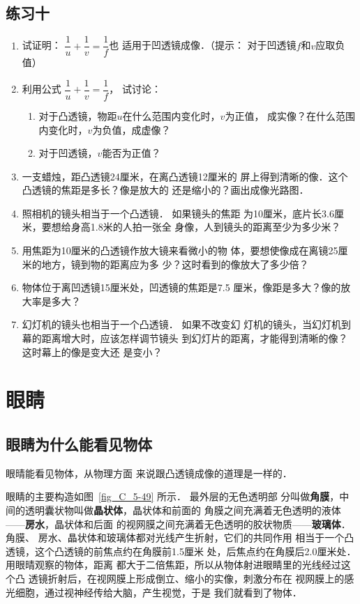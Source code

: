 \subsection*{练习十}

\begin{enumerate}
    \item 试证明：
$\dfrac{1}{u}+\dfrac{1}{v}=\dfrac{1}{f}$也
适用于凹透镜成像．（提示：
对于凹透镜$f$和$v$应取负值）
\item  利用公式
$\dfrac{1}{u}+\dfrac{1}{v}=\dfrac{1}{f}$，
试讨论：
\begin{enumerate}
    \item 对于凸透镜，物距$u$在什么范围内变化时，$v$为正值，
    成实像？在什么范围内变化时，$v$为负值，成虚像？
    \item 对于凹透镜，$v$能否为正值？
\end{enumerate}
\item 一支蜡烛，距凸透镜24厘米，在离凸透镜12厘米的
屏上得到清晰的像．这个凸透镜的焦距是多长？像是放大的
还是缩小的？画出成像光路图．
\item 照相机的镜头相当于一个凸透镜．
如果镜头的焦距
为10厘米，底片长3.6厘米，要想给身高1.8米的人拍一张全
身像，人到镜头的距离至少为多少米？
\item 用焦距为10厘米的凸透镜作放大镜来看微小的物
体，要想使像成在离镜25厘米的地方，镜到物的距离应为多
少？这时看到的像放大了多少倍？
\item 物体位于离凹透镜15厘米处，凹透镜的焦距是7.5
厘米，像距是多大？像的放大率是多大？
\item 幻灯机的镜头也相当于一个凸透镜．
如果不改变幻
灯机的镜头，当幻灯机到幕的距离增大时，应该怎样调节镜头
到幻灯片的距离，才能得到清晰的像？这时幕上的像是变大还
是变小？
\end{enumerate}

\section{眼睛}
\subsection{眼睛为什么能看见物体}

眼晴能看见物体，从物理方面
来说跟凸透镜成像的道理是一样的．


眼睛的主要构造如图~\ref{fig_C_5-49} 所示．
最外层的无色透明部
分叫做\textbf{角膜}，中间的透明囊状物叫做\textbf{晶状体}，晶状体和前面的
角膜之间充满着无色透明的液体——\textbf{房水}，晶状体和后面
的视网膜之间充满着无色透明的胶状物质——\textbf{玻璃体}．角膜、
房水、晶状体和玻璃体都对光线产生折射，它们的共同作用
相当于一个凸透镜，这个凸透镜的前焦点约在角膜前1.5厘米
处，后焦点约在角膜后2.0厘米处．用眼晴观察的物体，距离
都大于二倍焦距，所以从物体射进眼睛里的光线经过这个凸
透镜折射后，在视网膜上形成倒立、缩小的实像，刺激分布在
视网膜上的感光细胞，通过视神经传给大脑，产生视觉，于是
我们就看到了物体．

